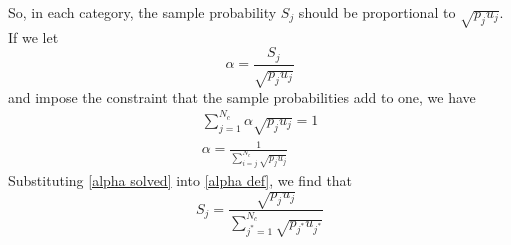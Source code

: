 \documentclass[11pt,fleqn]{article}
\begin{document}
So, in each category, the sample probability $S_j$ should be proportional to
$\sqrt{p_j u_j}$. If we let
\begin{equation}
\alpha = \frac{S_j}{\sqrt{p_j u_j}} \label{alpha def}
\end{equation}
and impose the constraint that the sample probabilities add to one, we have
\begin{gather}
\sum_{j=1}^{N_c} \alpha\sqrt{p_j u_j} = 1 \\
\alpha = \frac{1}{\sum_{i=j}^{N_c} \sqrt{p_j u_j}} \label{alpha solved}
\end{gather}
Substituting \eqref{alpha solved} into \eqref{alpha def}, we find that
\begin{equation}
S_j = \frac{\sqrt{p_j u_j}}{\sum_{j^*=1}^{N_c}\sqrt{p_{j^*} u_{j^*}}}
\end{equation}

%

\clearpage

\end{document}
